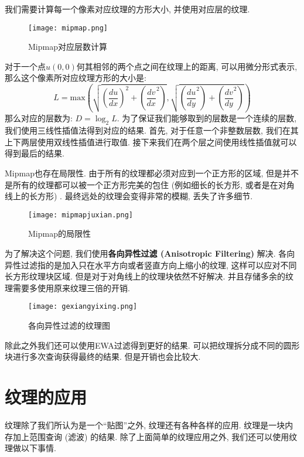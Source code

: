 \documentclass[openany]{progbookcn}
\begin{document}
我们需要计算每一个像素对应纹理的方形大小, 并使用对应层的纹理. 
\begin{figure}[H]
	\centering
	\texttt{[image: mipmap.png]}
	\caption{Mipmap对应层数计算}
	\label{fig:mipmap}
\end{figure}
对于一个点$u(0,0)$何其相邻的两个点之间在纹理上的距离, 可以用微分形式表示, 那么这个像素所对应纹理方形的大小是: 
\begin{equation}
	L= \text{max}(\sqrt{(\frac{du}{dx})^2+(\frac{dv}{dx}^2)},\sqrt{(\frac{du}{dy}^2)+(\frac{dv}{dy}^2)})
\end{equation}
那么对应的层数为: $D=\log_2L$. 
为了保证我们能够取到的层数是一个连续的层数, 我们使用三线性插值法得到对应的结果. 首先, 对于任意一个非整数层数, 我们在其上下两层使用双线性插值进行取值. 接下来我们在两个层之间使用线性插值就可以得到最后的结果. 

Mipmap也存在局限性. 由于所有的纹理都必须对应到一个正方形的区域, 但是并不是所有的纹理都可以被一个正方形完美的包住 (例如细长的长方形, 或者是在对角线上的长方形) . 最终远处的纹理会变得非常的模糊, 丢失了许多细节. 
\begin{figure}[H]
	\centering
	\texttt{[image: mipmapjuxian.png]}
	\caption{Mipmap的局限性}
	\label{fig:mipmapjuxian}
\end{figure}
为了解决这个问题, 我们使用\textbf{各向异性过滤 (Anisotropic Filtering) }解决. 各向异性过滤指的是加入只在水平方向或者竖直方向上缩小的纹理, 这样可以应对不同长方形纹理块区域. 但是对于对角线上的纹理块依然不好解决. 并且存储多余的纹理需要多使用原来纹理三倍的开销. 
\begin{figure}[H]
	\centering
	\texttt{[image: gexiangyixing.png]}
	\caption{各向异性过滤的纹理图}
	\label{fig:gexiangyixing}
\end{figure}
除此之外我们还可以使用EWA过滤得到更好的结果. 可以把纹理拆分成不同的圆形块进行多次查询获得最终的结果. 但是开销也会比较大. 

\section{纹理的应用}
纹理除了我们所认为是一个“贴图”之外, 纹理还有各种各样的应用. 纹理是一块内存加上范围查询 (滤波) 的结果. 除了上面简单的纹理应用之外, 我们还可以使用纹理做以下事情. 
\end{document}
